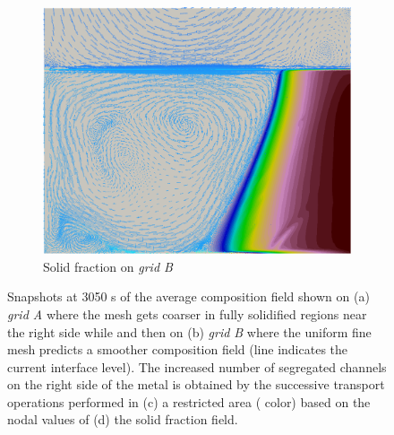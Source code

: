 \begin{figure}[H]
\begin{subfigure}[t]{0.4\textwidth}
  \includegraphics[width=\textwidth]{Chapter5/Graphics/2d/1200s_gs_vl.png}
  \caption{Solid fraction on \emph{grid B}}
    \label{fig:1200s_gs}
  \end{subfigure}
\caption{Snapshots at 3050 s of the average composition field shown on (a) \emph{grid A} where the mesh gets coarser in fully solidified regions near the right side while
and then on (b) \emph{grid B} where the uniform fine mesh predicts a smoother composition field (line indicates the current interface level). 
The increased number of segregated channels on the right side of the
metal is obtained by the successive transport operations performed in (c) a restricted area ( color) based on the nodal values of (d) the solid fraction field.}
\label{fig:W_mask_1200s}
\end{figure}

